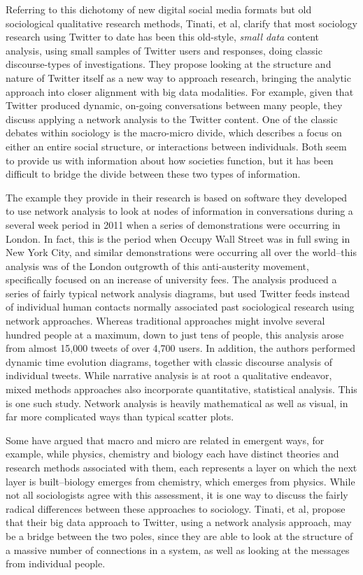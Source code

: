 \documentclass[sigconf]{acmart}
\begin{document}
Referring to this dichotomy of new digital social media formats but old sociological qualitative research methods, Tinati, et al, clarify that most sociology research using Twitter to date has been this old-style, {\em small data} content analysis, using small samples of Twitter users and responses, doing classic discourse-types of investigations.  They propose looking at the structure and nature of Twitter itself as a new way to approach research, bringing the analytic approach into closer alignment with big data modalities.  For example, given that Twitter produced dynamic, on-going conversations between many people, they discuss applying a network analysis to the Twitter content. \cite{felt16} One of the classic debates within sociology is the macro-micro divide, which describes a focus on either an entire social structure, or interactions between individuals.  Both seem to provide us with information about how societies function, but it has been difficult to bridge the divide between these two types of information.  

The example they provide in their research is based on software they developed to use network analysis to look at nodes of information in conversations during a several week period in 2011 when a series of demonstrations were occurring in London. \cite{tinati14} In fact, this is the period when Occupy Wall Street was in full swing in New York City, and similar demonstrations were occurring all over the world--this analysis was of the London outgrowth of this anti-austerity movement, specifically focused on an increase of university fees.  The analysis produced a series of fairly typical network analysis diagrams, but used Twitter feeds instead of individual human contacts normally associated past sociological research using network approaches.  Whereas traditional approaches might involve several hundred people at a maximum, down to just tens of people, this analysis arose from almost 15,000 tweets of over 4,700 users.  In addition, the authors performed dynamic time evolution diagrams, together with classic discourse analysis of individual tweets.  While narrative analysis is at root a qualitative endeavor, mixed methods approaches also incorporate quantitative, statistical analysis.  This is one such study.  Network analysis is heavily mathematical as well as visual, in far more complicated ways than typical scatter plots. \cite{tinati14}

Some have argued that macro and micro are related in emergent ways, for example, while physics, chemistry and biology each have distinct theories and research methods associated with them, each represents a layer on which the next layer is built--biology emerges from chemistry, which emerges from physics. \cite{sawyer07}  While not all sociologists agree with this assessment, it is one way to discuss the fairly radical differences between these approaches to sociology.  Tinati, et al, propose that their big data approach to Twitter, using a network analysis approach, may be a bridge between the two poles, since they are able to look at the structure of a massive number of connections in a system, as well as looking at the messages from individual people. \cite{tinati14} 
\end{document}
